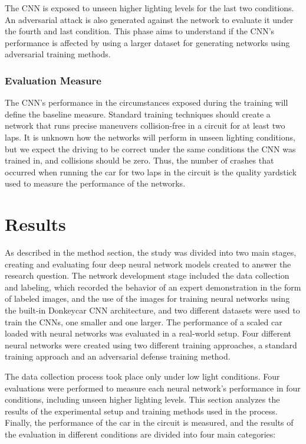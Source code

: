\documentclass[12pt]{article}
\begin{document}
The CNN is exposed to unseen higher lighting levels for the last two conditions. An adversarial attack is also generated against the network to evaluate it under the fourth and last condition. 
This phase aims to understand if the CNN's performance is affected by using a larger dataset for generating networks using adversarial training methods.

\subsubsection{Evaluation Measure}

The CNN's performance in the circumstances exposed during the training will define the baseline measure. Standard training techniques should create a network that runs precise maneuvers collision-free in a circuit for at least two laps. It is unknown how the networks will perform in unseen lighting conditions, but we expect the driving to be correct under the same conditions the CNN was trained in, and collisions should be zero. Thus, the number of crashes that occurred when running the car for two laps in the circuit is the quality yardstick used to measure the performance of the networks.

\clearpage %
\section{Results}

As described in the method section, the study was divided into two main stages, creating and evaluating four deep neural network models created to answer the research question. The network development stage included the data collection and labeling, which recorded the behavior of an expert demonstration in the form of labeled images, and the use of the images for training neural networks using the built-in Donkeycar CNN architecture, and two different datasets were used to train the CNNs, one smaller and one larger. The performance of a scaled car loaded with neural networks was evaluated in a real-world setup. Four different neural networks were created using two different training approaches, a standard training approach and an adversarial defense training method. 

The data collection process took place only under low light conditions. Four evaluations were performed to measure each neural network's performance in four conditions, including unseen higher lighting levels. This section analyzes the results of the experimental setup and training methods used in the process. Finally, the performance of the car in the circuit is measured, and the results of the evaluation in different conditions are divided into four main categories: 
\end{document}
